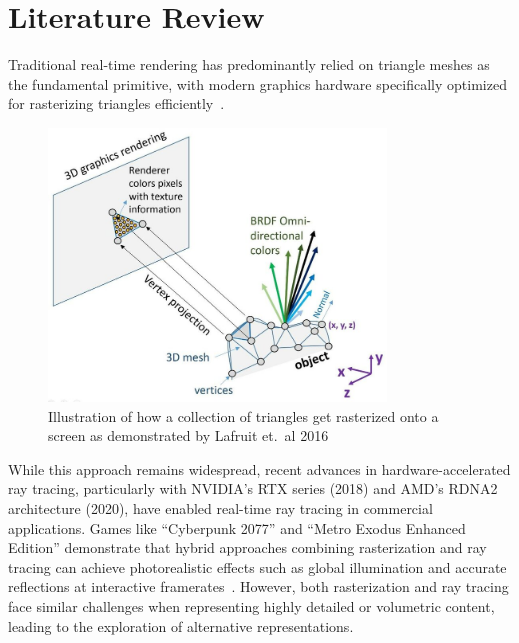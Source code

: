\chapter{Literature Review}
Traditional real-time rendering has predominantly relied on triangle meshes as the fundamental primitive, with modern
graphics hardware specifically optimized for rasterizing triangles efficiently~\cite{akenine2019real}.

\begin{figure}[thp]
    \begin{center}
        \includegraphics[width=0.8\textwidth]{figures/mesh_rendering.jpg}
    \end{center}
    \caption{Illustration of how a collection of triangles get rasterized onto a screen as demonstrated by Lafruit et.\ al 2016}
\end{figure}

While this approach remains widespread, recent advances in hardware-accelerated ray tracing, particularly with NVIDIA's
RTX series (2018) and AMD's RDNA2 architecture (2020), have enabled real-time ray tracing in commercial applications.
Games like ``Cyberpunk 2077'' and ``Metro Exodus Enhanced Edition'' demonstrate that hybrid approaches combining
rasterization and ray tracing can achieve photorealistic effects such as global illumination and accurate reflections at
interactive framerates~\cite{keller2019we}. However, both rasterization and ray tracing face similar challenges when
representing highly detailed or volumetric content, leading to the exploration of alternative representations.

